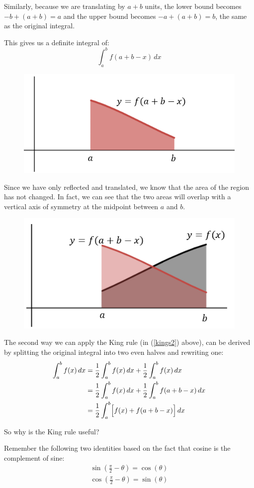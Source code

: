 \documentclass[../main.tex]{subfiles}
\begin{document}
Similarly, because we are translating by $a+b$ units, the lower bound becomes $-b+(a+b)=a$ and the upper bound becomes $-a+(a+b)=b$, the same as the original integral.

This gives us a definite integral of:
\[\int_{a}^{b} f(a+b-x)\,dx\]

\begin{figure}[h]
    \centering
    \includegraphics[width=0.4\linewidth]{images/kingsrule3.png}
\end{figure}

Since we have only reflected and translated, we know that the area of the region has not changed. In fact, we can see that the two areas will overlap with a vertical axis of symmetry at the midpoint between $a$ and $b$.

\begin{figure}[h]
    \centering
    \includegraphics[width=0.4\linewidth]{images/kingsrule4.png}
\end{figure}

The second way we can apply the King rule (in (\ref{kings2}) above), can be derived by splitting the original integral into two even halves and rewriting one:
\begin{align*}
    \int_{a}^{b} f(x)\,dx &= \frac{1}{2}\int_{a}^{b} f(x)\,dx + \frac{1}{2}\int_{a}^{b} f(x)\,dx \\
    &=\frac{1}{2}\int_{a}^{b} f(x)\,dx + \frac{1}{2}\int_{a}^{b} f(a+b-x)\, dx \\
    &= \frac{1}{2}\int_{a}^{b} \Bigl[f(x) + f(a+b-x)\Bigl]\, dx
\end{align*}

So why is the King rule useful? 

Remember the following two identities based on the fact that cosine is the complement of sine:
\begin{align*}
    \sin{(\frac{\pi}{2}-\theta)}=\cos{(\theta)}\\
    \cos{(\frac{\pi}{2}-\theta)}=\sin{(\theta)}
\end{align*}
\end{document}
